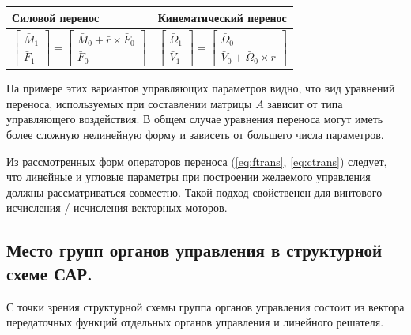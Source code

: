\begin{table}[ht]
	\centering
	\begin{tabular}{| p{7cm} | p{7cm} |}
		\hline
		Силовой перенос & Кинематический перенос \\
		\hline
		\begin{equation} \label{eq:ftrans}
		\begin{bmatrix} \bar{M}_1 \\ \bar{F}_1 \end{bmatrix} 
			= \begin{bmatrix} \bar{M}_0 + \bar{r} \times \bar{F}_0 \\ \bar{F}_0 \end{bmatrix}
		\end{equation}
		&
		\begin{equation} \label{eq:ctrans}
		\begin{bmatrix} \bar{\Omega}_1 \\ \bar{V}_1 \end{bmatrix} 
			= \begin{bmatrix} \bar{\Omega}_0 \\ \bar{V}_0 + \bar{\Omega}_0 \times \bar{r} \end{bmatrix}
		\end{equation}\\
		
		\hline
	\end{tabular}
\end{table}

На примере этих вариантов управляющих параметров видно, что вид уравнений переноса, используемых при составлении матрицы $A$ зависит от типа управляющего воздействия. В общем случае уравнения переноса могут иметь более сложную нелинейную форму и зависеть от большего числа параметров. 

Из рассмотренных форм операторов переноса (\ref{eq:ftrans}, \ref{eq:ctrans}) следует, что линейные и угловые параметры при построении желаемого управления должны рассматриваться совместно. Такой подход свойственен для винтового исчисления / исчисления векторных моторов. 

\subsection{Место групп органов управления в структурной схеме САР.}
С точки зрения структурной схемы группа органов управления состоит из вектора передаточных функций отдельных органов управления и линейного решателя.

